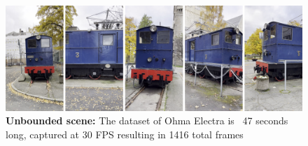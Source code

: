 \begin{figure}[!h]
    \centering
    \includegraphics[width=1.0\textwidth]{figures/ohma_electra.png}
    \caption{\textbf{Unbounded scene:} The dataset of Ohma Electra is ~47 seconds long, captured at 30 FPS resulting in 1416 total frames}
    \label{fig:ohma-electra}
\end{figure}
